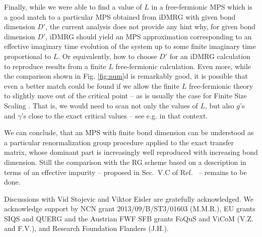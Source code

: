 \documentclass[prl,twocolumn,showpacs,floatfix,superscriptaddress,nofootinbib]{revtex4-1}
\begin{document}
Finally, while we were able to find a value of $L$ in a free-fermionic MPS which is a good match to a particular MPS obtained from iDMRG with given bond dimension $D'$, the current analysis does not provide any hint why, for given bond dimension $D'$, iDMRG should yield an MPS approximation corresponding to an effective imaginary time evolution of the system up to some finite imaginary time proportional to $L$. 
Or equivalently, how to choose $D'$ for an iDMRG calculation to reproduce results from a finite $L$ free-fermionic calculation. 
Even more, while the comparison shown in Fig. \ref{fig:num}d is remarkably good, it is possible that even a better match could be found if we allow the finite $L$ free-fermionic theory to slightly move out of the critical point -- as is usually the case for Finite Size Scaling \cite{Privman1990}.
That is, we would need to scan not only the values of $L$, but also $g$'s and $\gamma$'s close to the exact critical values -- see e.g. \cite{Tagliacozzo2008} in that context.



We can conclude, that an MPS  with finite bond dimension can be understood as a particular renormalization group procedure applied to the exact transfer matrix, whose dominant part is increasingly well reproduced with increasing bond dimension. Still the comparison with the RG scheme based on a description in terms of an effective impurity -- proposed in Sec.~V.C of Ref.~\cite{Zauner2014} -- remains to be done.

Discussions with Vid Stojevic and Viktor Eisler are gratefully acknowledged.  
We acknowledge support by NCN grant 2013/09/B/ST3/01603 (M.M.R.), EU grants SIQS and QUERG and the Austrian FWF SFB grants FoQuS and ViCoM (V.Z. and F.V.), and Research Foundation Flanders (J.H.).

\end{document}
